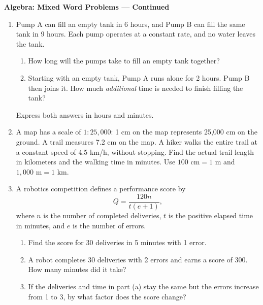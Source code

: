 \documentclass[12pt]{article}
\begin{document}
\newpage
\begin{center}
  {\large\textbf{Algebra: Mixed Word Problems --- Continued}}
\end{center}

\begin{enumerate}[leftmargin=*,itemsep=0pt,resume]
  \item Pump A can fill an empty tank in 6 hours, and Pump B can fill the
  same tank in 9 hours. Each pump operates at a constant rate, and no water
  leaves the tank.
  \begin{enumerate}[label=(\alph*),leftmargin=1.6em,itemsep=0.2em]
    \item How long will the pumps take to fill an empty tank together?
    \item Starting with an empty tank, Pump A runs alone for 2 hours.
    Pump B then joins it. How much \emph{additional} time is needed to
    finish filling the tank?
  \end{enumerate}
  Express both answers in hours and minutes.

  \item A map has a scale of $1:25{,}000$: 1 cm on the map represents
  25,000 cm on the ground. A trail measures 7.2 cm on the map. A hiker
  walks the entire trail at a constant speed of 4.5 km/h, without stopping.
  Find the actual trail length in kilometers and the walking time in
  minutes. Use $100\text{ cm}=1\text{ m}$ and $1{,}000\text{ m}=1\text{ km}$.

  \item A robotics competition defines a performance score by
  \[
    Q=\frac{120n}{t(e+1)},
  \]
  where $n$ is the number of completed deliveries, $t$ is the positive
  elapsed time in minutes, and $e$ is the number of errors.
  \begin{enumerate}[label=(\alph*),leftmargin=1.6em,itemsep=0.2em]
    \item Find the score for 30 deliveries in 5 minutes with 1 error.
    \item A robot completes 30 deliveries with 2 errors and earns a score
    of 300. How many minutes did it take?
    \item If the deliveries and time in part (a) stay the same but the
    errors increase from 1 to 3, by what factor does the score change?
  \end{enumerate}
\end{enumerate}
\end{document}
